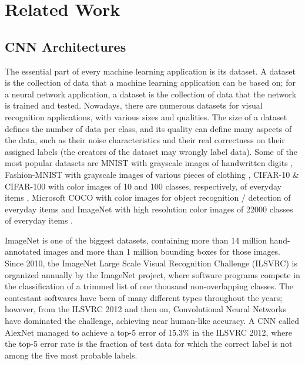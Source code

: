 \chapter{Related Work}

\label{Chapter-Related-Work}

\section{CNN Architectures}
\label{section:CNN-Architectures}
The essential part of every machine learning application is its dataset. A dataset is the collection of data that a machine learning application can be based on; for a neural network application, a dataset is the collection of data that the network is trained and tested. Nowadays, there are numerous datasets for visual recognition applications, with various sizes and qualities. The size of a dataset defines the number of data per class, and its quality can define many aspects of the data, such as their noise characteristics and their real correctness on their assigned labels (the creators of the dataset may wrongly label data). Some of the most popular datasets are MNIST with grayscale images of handwritten digits \cite{The-MNIST-database-of-handwritten-digits} \cite{MNIST-database-Wikipedia}, Fashion-MNIST with grayscale images of various pieces of clothing \cite{Fashion-MNIST-a-Novel-Image-Dataset-for-Benchmarking-Machine-Learning-Algorithms} \cite{Fashion-MNIST-Github}, CIFAR-10 \& CIFAR-100 with color images of 10 and 100 classes, respectively, of everyday items \cite{CIFAR-10-CIFAR-100} \cite{CIFAR-10-CIFAR-100-Wikipedia}, Microsoft COCO with color images for object recognition / detection of everyday items \cite{Microsoft-COCO-Common-Objects-in-Context} \cite{MS-COCO} and ImageNet with high resolution color images of 22000 classes of everyday items \cite{ImageNet-Official-site} \cite{ImageNet-Wikipedia}.

ImageNet is one of the biggest datasets, containing more than 14 million hand-annotated images and more than 1 million bounding boxes for those images. Since 2010, the ImageNet Large Scale Visual Recognition Challenge (ILSVRC) is organized annually by the ImageNet project, where software programs compete in the classification of a trimmed list of one thousand non-overlapping classes. The contestant softwares have been of many different types throughout the years; however, from the ILSVRC 2012 and then on, Convolutional Neural Networks have dominated the challenge, achieving near human-like accuracy. A CNN called AlexNet \cite{ImageNet-classification-with-deep-convolutional-neural-networks} managed to achieve a top-5 error of 15.3\% in the ILSVRC 2012, where the top-5 error rate is the fraction of test data for which the correct label is not among the five most probable labels.


